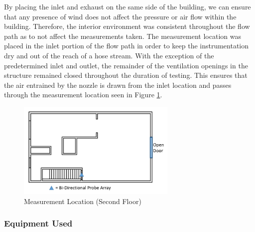 \documentclass{article}
\begin{document}



By placing the inlet and exhaust on the same side of the building, we can ensure that any presence of wind does not affect the pressure or air flow within the building. Therefore, the interior environment was consistent throughout the flow path as to not affect the measurements taken. The measurement location was placed in the inlet portion of the flow path in order to keep the instrumentation dry and out of the reach of a hose stream. With the exception of the predetermined inlet and outlet, the remainder of the ventilation openings in the structure remained closed throughout the duration of testing. This ensures that the air entrained by the nozzle is drawn from the inlet location and passes through the measurement location seen in Figure \ref{fig:Measurement_Location_Second_Floor}.

\begin{figure}[!ht]
	\centering
	\includegraphics[width=3in]{Figures/Air_Entrainment/Measurement_Locations_Secondfloor.png}
	\caption{Measurement Location (Second Floor)}
	\label{fig:Measurement_Location_Second_Floor}
\end{figure}

\clearpage

\subsubsection{Equipment Used}
\end{document}
